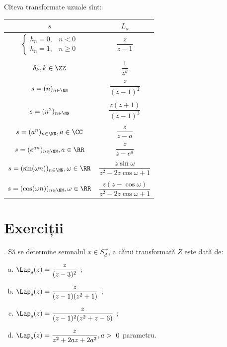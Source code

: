 Cîteva transformate uzuale sînt:
\begin{tabular}{c | c}
  $ s $ & $ L_s $ \\
  \hline\hline
  $ \begin{cases}
    h_n = 0, & n < 0 \\
    h_n = 1, & n \geq 0
  \end{cases} $ & $ \dfrac{z}{z - 1} $ \\
        & \\
  $ \delta_k, k \in \ZZ $ & $ \dfrac{1}{z^k} $ \\
        &\\
  $ s = (n)_{n \in \NN} $ & $ \dfrac{z}{(z - 1)^2} $ \\
        &\\
  $ s = (n^2)_{n \in \NN} $ & $ \dfrac{z(z+1)}{(z - 1)^3} $ \\
        &\\
  $ s = (a^n)_{n \in \NN}, a \in \CC $ & $ \dfrac{z}{z - a} $ \\
        &\\
  $ s = (e^{an})_{n \in \NN}, a \in \RR $ & $ \dfrac{z}{z - e^a} $ \\
        &\\
  $ s = (\sin(\omega n))_{n \in \NN}, \omega \in \RR $ & $ \dfrac{z \sin \omega}{z^2 - 2z \cos \omega + 1} $ \\
        &\\
  $ s = (\cos(\omega n))_{n \in \NN}, \omega \in \RR $ & $ \dfrac{z(z - \cos \omega)}{z^2 - 2z \cos \omega + 1} $
\end{tabular}


\section{Exerciții}

\indent{}. Să se determine semnalul $x \in S_d^+$, a cărui transformată $Z$ este 
dată de:
\begin{enumerate}[(a)]
\item $\Lap_s (z) = \dfrac{z}{(z-3)^2}$ ;
\item $\Lap_s (z) = \dfrac{z}{(z-1)(z^2 + 1)}$ ;
\item $\Lap_s (z) = \dfrac{z}{(z-1)^2(z^2 + z - 6)}$ ;
\item $\Lap_s (z) = \dfrac{z}{z^2 + 2az + 2a^2}, a > 0$ parametru.
\end{enumerate}

